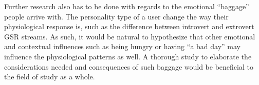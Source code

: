Further research also has to be done with regards to the emotional ``baggage'' people arrive with. 
The personality type of a user change the way their physiological response is, such as the difference between introvert and extrovert GSR streams. 
As such, it would be natural to hypothesize that other emotional and contextual influences such as being hungry or having ``a bad day'' may influence the physiological patterns as well. 
A thorough study to elaborate the considerations needed and consequences of such baggage would be beneficial to the field of study as a whole. 